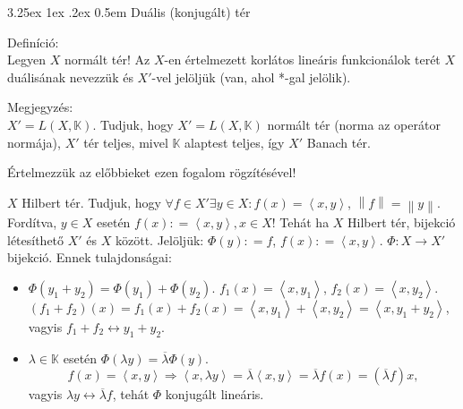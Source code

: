 \documentclass[12pt,a4paper]{scrartcl}
\makeatletter
\renewcommand\paragraph{\@startsection{paragraph}{4}{\z@}%
                                    {3.25ex \@plus1ex \@minus.2ex}%
                                    {0.5em} %
                                    {\normalfont\normalsize\bfseries}}
\providecommand{\tightlist}{%
  \setlength{\itemsep}{0pt}\setlength{\parskip}{0pt}}
\newenvironment{definicio}{}{}
\newenvironment{megjegyzes}{}{}
\makeatother
\begin{document}
\hypertarget{dualis-konjugalt-ter}{%
\paragraph{Duális (konjugált) tér}\label{dualis-konjugalt-ter}}

\begin{definicio}

Definíció:\\
Legyen \(X\) normált tér! Az \(X\)-en értelmezett korlátos lineáris
funkcionálok terét \(X\) duálisának nevezzük és \(X'\)-vel jelöljük
(van, ahol *-gal jelölik).

\end{definicio}

\begin{megjegyzes}

Megjegyzés:\\
\(X' = L\left( {X,{\mathbb{K}}} \right)\). Tudjuk, hogy
\(X' = L\left( {X,{\mathbb{K}}} \right)\) normált tér (norma az operátor
normája), \(X'\) tér teljes, mivel \(\mathbb{K}\) alaptest teljes, így
\(X'\) Banach tér.

\end{megjegyzes}

Értelmezzük az előbbieket ezen fogalom rögzítésével!

\(X\) Hilbert tér. Tudjuk, hogy
\(\forall f \in X'\exists y \in X:f\left( x \right) = \left\langle {x,y} \right\rangle\),
\(\left\| f \right\| = \left\| y \right\|\). Fordítva, \(y \in X\)
esetén
\(f\left( x \right): = \left\langle {x,y} \right\rangle,x \in X\)! Tehát
ha \(X\) Hilbert tér, bijekció létesíthető \(X'\) és \(X\) között.
Jelöljük: \(\Phi\left( y \right): = f\),
\(f\left( x \right): = \left\langle {x,y} \right\rangle\).
\(\left. \Phi:X\rightarrow X' \right.\) bijekció. Ennek tulajdonságai:

\begin{itemize}
\tightlist
\item
  \(\Phi\left( {y_{1} + y_{2}} \right) = \Phi\left( y_{1} \right) + \Phi\left( y_{2} \right)\).
  \(f_{1}\left( x \right) = \left\langle {x,y_{1}} \right\rangle\),
  \(f_{2}\left( x \right) = \left\langle {x,y_{2}} \right\rangle\).
  \(\left( {f_{1} + f_{2}} \right)\left( x \right) = f_{1}\left( x \right) + f_{2}\left( x \right) = \left\langle {x,y_{1}} \right\rangle + \left\langle {x,y_{2}} \right\rangle = \left\langle {x,y_{1} + y_{2}} \right\rangle\),
  vagyis \(\left. f_{1} + f_{2}\leftrightarrow y_{1} + y_{2} \right.\).
\item
  \(\lambda \in {\mathbb{K}}\) esetén
  \(\Phi\left( {\lambda y} \right) = \overline{\lambda}\Phi\left( y \right)\).
  \[\left. f\left( x \right) = \left\langle {x,y} \right\rangle\Rightarrow\left\langle {x,\lambda y} \right\rangle = \overline{\lambda}\left\langle {x,y} \right\rangle = \overline{\lambda}f\left( x \right) = \left( {\overline{\lambda}f} \right)x, \right.\]vagyis
  \(\left. \lambda y\leftrightarrow\overline{\lambda}f \right.\), tehát
  \(\Phi\) konjugált lineáris.
\end{itemize}
\end{document}
